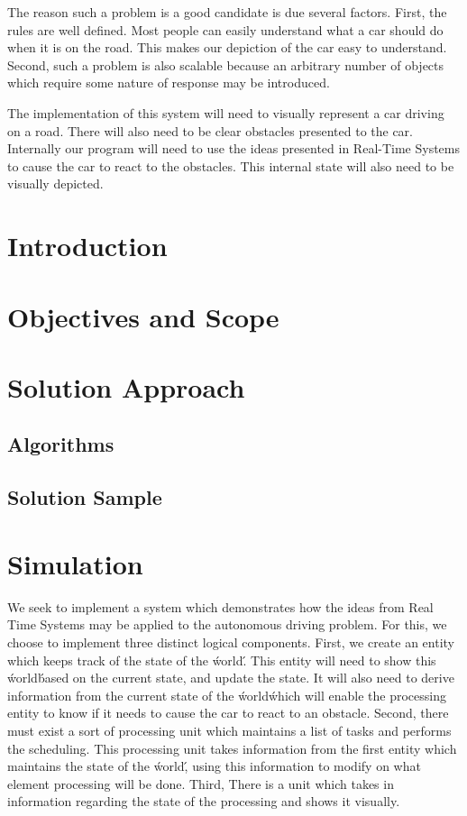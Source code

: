 \documentclass{article} %
\begin{document}
The reason such a problem is a good candidate is due several factors.
First, the rules are well defined. Most people can easily understand what a car should do when it is on the road. This makes our depiction of the car easy to understand.
Second, such a problem is also scalable because an arbitrary number of objects which require some nature of response may be introduced.

The implementation of this system will need to visually represent a car driving on a road.
There will also need to be clear obstacles presented to the car.
Internally our program will need to use the ideas presented in Real-Time Systems to cause the car to react to the obstacles.
This internal state will also need to be visually depicted.

\section{Introduction}

\section{Objectives and Scope}

\section{Solution Approach}
\subsection{Algorithms}

\subsection{Solution Sample}

\section{Simulation}
We seek to implement a system which demonstrates how the ideas from Real Time Systems may be applied to the autonomous driving problem.
For this, we choose to implement three distinct logical components.
First, we create an entity which keeps track of the state of the \'world\'. This entity will need to show this \'world\' based on the current state, and update the state. It will also need to derive information from the current state of the \'world\' which will enable the processing entity to know if it needs to cause the car to react to an obstacle.
Second, there must exist a sort of processing unit which maintains a list of tasks and performs the scheduling. This processing unit takes information from the first entity which maintains the state of the \'world\', using this information to modify on what element  processing will be done.
Third, There is a unit which takes in information regarding the state of the processing and shows it visually.
\end{document}
